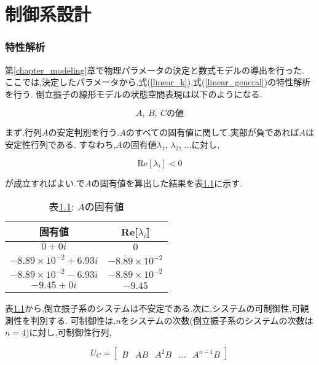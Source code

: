 \chapter{制御系設計}
\subsection{特性解析}
第\ref{chapter_modeling}章で物理パラメータの決定と数式モデルの導出を行った.
ここでは,決定したパラメータから,式(\ref{linear_k}),式(\ref{linear_general})の特性解析を行う.
倒立振子の線形モデルの状態空間表現は以下のようになる.

\begin{equation}
    A,\ B,\ Cの値
    \label{ABC}
\end{equation}

まず,行列$A$の安定判別を行う.$A$のすべての固有値に関して,実部が負であれば$A$は安定性行列である.
すなわち,$A$の固有値$\lambda_{1}$, $\lambda_{2}$, $...$に対し,

$$
    \mbox{Re}[\lambda_{i}] < 0
$$

が成立すればよい.\MaTX{}で$A$の固有値を算出した結果を表\ref{eigen_A}に示す.

\begin{table}[htbp]
    \begin{center}
        \caption{表\ref{eigen_A}: $A$の固有値}
        \begin{tabular}{|c|c|} \hline
            固有値 & Re[$\lambda_{i}$] \\ \hline \hline
            $0 + 0i$ & $0$ \\ \hline
            $-8.89 \times 10^{-2} + 6.93i$ & $-8.89 \times 10^{-2}$ \\ \hline
            $-8.89 \times 10^{-2} - 6.93i$ & $-8.89 \times 10^{-2}$ \\ \hline
            $-9.45 + 0i$ & $-9.45$ \\ \hline
        \end{tabular}
        \label{eigen_A}
    \end{center}
\end{table}

表\ref{eigen_A}から,倒立振子系のシステムは不安定である.次に,システムの可制御性,可観測性を判別する.
可制御性は,$n$をシステムの次数(倒立振子系のシステムの次数は$n = 4$)に対し,可制御性行列,

$$
    U_{C} =
    \left[
        \begin{array}{ccccc}
            B  &  AB  &  A^2B  &  \dots  &  A^{n-1}B
        \end{array}
    \right]
$$

